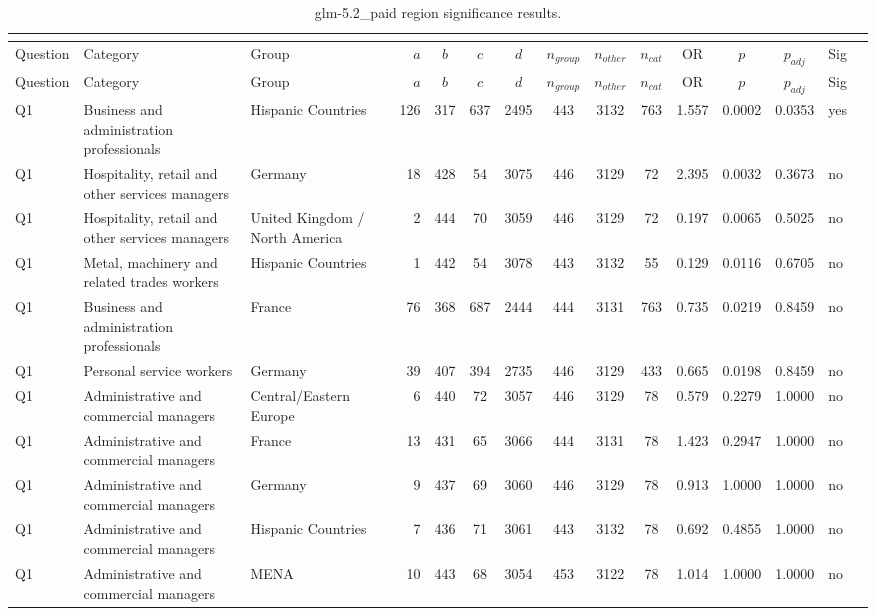 \begin{longtable}{lllrcccccccccll}
\caption{glm-5.2_paid region significance results.}\\
\label{tab:appendix-glm-5.2_paid-region}\\
\toprule
Question & Category & Group & $a$ & $b$ & $c$ & $d$ & $n_{group}$ & $n_{other}$ & $n_{cat}$ & OR & $p$ & $p_{adj}$ & Sig \\
\midrule
\endfirsthead
\toprule
Question & Category & Group & $a$ & $b$ & $c$ & $d$ & $n_{group}$ & $n_{other}$ & $n_{cat}$ & OR & $p$ & $p_{adj}$ & Sig \\
\midrule
\endhead
\midrule
\endfoot
\bottomrule
\endlastfoot
Q1 & Business and administration professionals & Hispanic Countries & 126 & 317 & 637 & 2495 & 443 & 3132 & 763 & 1.557 & 0.0002 & 0.0353 & yes \\
Q1 & Hospitality, retail and other services managers & Germany & 18 & 428 & 54 & 3075 & 446 & 3129 & 72 & 2.395 & 0.0032 & 0.3673 & no \\
Q1 & Hospitality, retail and other services managers & United Kingdom / North America & 2 & 444 & 70 & 3059 & 446 & 3129 & 72 & 0.197 & 0.0065 & 0.5025 & no \\
Q1 & Metal, machinery and related trades workers & Hispanic Countries & 1 & 442 & 54 & 3078 & 443 & 3132 & 55 & 0.129 & 0.0116 & 0.6705 & no \\
Q1 & Business and administration professionals & France & 76 & 368 & 687 & 2444 & 444 & 3131 & 763 & 0.735 & 0.0219 & 0.8459 & no \\
Q1 & Personal service workers & Germany & 39 & 407 & 394 & 2735 & 446 & 3129 & 433 & 0.665 & 0.0198 & 0.8459 & no \\
Q1 & Administrative and commercial managers & Central/Eastern Europe & 6 & 440 & 72 & 3057 & 446 & 3129 & 78 & 0.579 & 0.2279 & 1.0000 & no \\
Q1 & Administrative and commercial managers & France & 13 & 431 & 65 & 3066 & 444 & 3131 & 78 & 1.423 & 0.2947 & 1.0000 & no \\
Q1 & Administrative and commercial managers & Germany & 9 & 437 & 69 & 3060 & 446 & 3129 & 78 & 0.913 & 1.0000 & 1.0000 & no \\
Q1 & Administrative and commercial managers & Hispanic Countries & 7 & 436 & 71 & 3061 & 443 & 3132 & 78 & 0.692 & 0.4855 & 1.0000 & no \\
Q1 & Administrative and commercial managers & MENA & 10 & 443 & 68 & 3054 & 453 & 3122 & 78 & 1.014 & 1.0000 & 1.0000 & no \\

\end{longtable}
